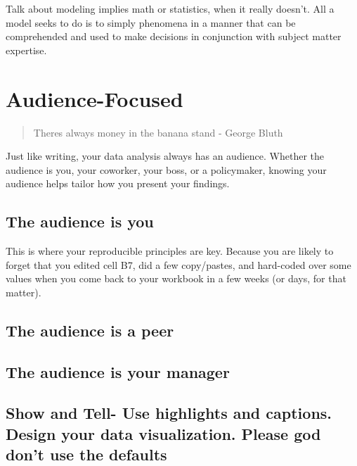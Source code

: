 \documentclass[]{book}
\begin{document}
Talk about modeling implies math or statistics, when it really doesn't. All a model seeks to do is to simply phenomena in a manner that can be comprehended and used to make decisions in conjunction with subject matter expertise.

\hypertarget{audience-focused}{%
\chapter{Audience-Focused}\label{audience-focused}}

\begin{quote}
Theres always money in the banana stand - George Bluth
\end{quote}

Just like writing, your data analysis always has an audience. Whether the audience is you, your coworker, your boss, or a policymaker, knowing your audience helps tailor how you present your findings.

\hypertarget{the-audience-is-you}{%
\section{The audience is you}\label{the-audience-is-you}}

This is where your reproducible principles are key. Because you are likely to forget that you edited cell B7, did a few copy/pastes, and hard-coded over some values when you come back to your workbook in a few weeks (or days, for that matter).

\hypertarget{the-audience-is-a-peer}{%
\section{The audience is a peer}\label{the-audience-is-a-peer}}

\hypertarget{the-audience-is-your-manager}{%
\section{The audience is your manager}\label{the-audience-is-your-manager}}

\hypertarget{show-and-tell--use-highlights-and-captions.-design-your-data-visualization.-please-god-dont-use-the-defaults}{%
\section{Show and Tell- Use highlights and captions. Design your data visualization. Please god don't use the defaults}\label{show-and-tell--use-highlights-and-captions.-design-your-data-visualization.-please-god-dont-use-the-defaults}}
\end{document}
